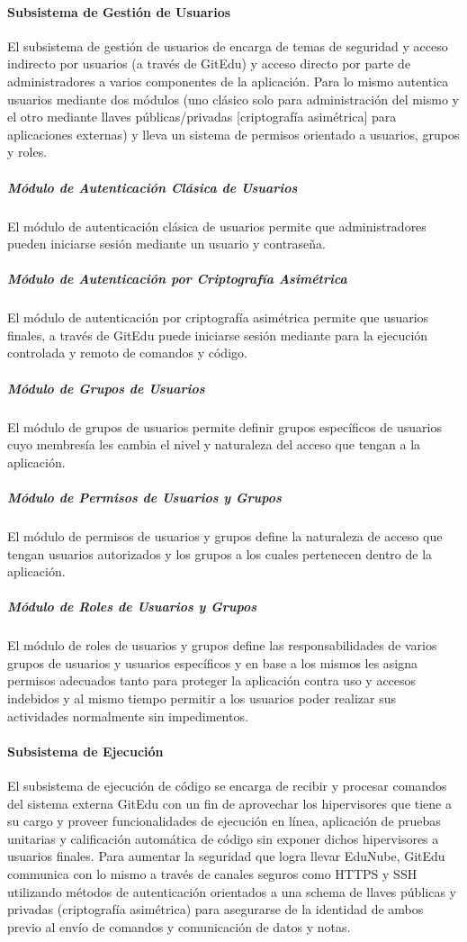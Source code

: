 \paragraph{Subsistema de Gestión de Usuarios}
El subsistema de gestión de usuarios de encarga de temas de seguridad y acceso indirecto por usuarios (a través de GitEdu) y acceso directo por parte de administradores a varios componentes de la aplicación. Para lo mismo autentica usuarios mediante dos módulos (uno clásico solo para administración del mismo y el otro mediante llaves públicas/privadas [criptografía asimétrica] para aplicaciones externas) y lleva un sistema de permisos orientado a usuarios, grupos y roles.

\subparagraph{Módulo de Autenticación Clásica de Usuarios}
El módulo de autenticación clásica de usuarios permite que administradores pueden iniciarse sesión mediante un usuario y contraseña.

\subparagraph{Módulo de Autenticación por Criptografía Asimétrica}
El módulo de autenticación por criptografía asimétrica permite que usuarios finales, a través de GitEdu puede iniciarse sesión mediante para la ejecución controlada y remoto de comandos y código.

\subparagraph{Módulo de Grupos de Usuarios}
El módulo de grupos de usuarios permite definir grupos específicos de usuarios cuyo membresía les cambia el nivel y naturaleza del acceso que tengan a la aplicación.

\subparagraph{Módulo de Permisos de Usuarios y Grupos}
El módulo de permisos de usuarios y grupos define la naturaleza de acceso que tengan usuarios autorizados y los grupos a los cuales pertenecen dentro de la aplicación.

\subparagraph{Módulo de Roles de Usuarios y Grupos}
El módulo de roles de usuarios y grupos define las responsabilidades de varios grupos de usuarios y usuarios específicos y en base a los mismos les asigna permisos adecuados tanto para proteger la aplicación contra uso y accesos indebidos y al mismo tiempo permitir a los usuarios poder realizar sus actividades normalmente sin impedimentos.

\paragraph{Subsistema de Ejecución}
 
El subsistema de ejecución de código se encarga de recibir y procesar  comandos del sistema externa GitEdu con un fin de aprovechar los hipervisores que tiene a su cargo y proveer funcionalidades de ejecución en línea, aplicación de pruebas unitarias y calificación automática de código sin exponer dichos hipervisores a usuarios finales. Para aumentar la seguridad que logra llevar EduNube, GitEdu communica con lo mismo a través de canales seguros como HTTPS y SSH utilizando métodos de autenticación orientados a una schema de llaves públicas y privadas (criptografía asimétrica) para asegurarse de la identidad de ambos previo al envío de comandos y comunicación de datos y notas.

